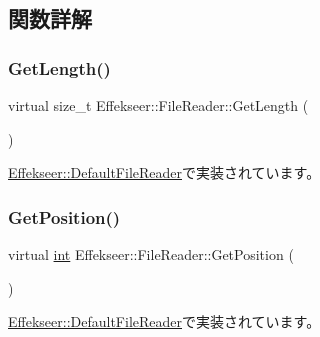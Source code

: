 \subsection{関数詳解}
\mbox{\label{class_effekseer_1_1_file_reader_ae802d02a06437baa0ed74f1927617924}} 
\subsubsection{\texorpdfstring{Get\+Length()}{GetLength()}}
{\footnotesize\ttfamily virtual size\+\_\+t Effekseer\+::\+File\+Reader\+::\+Get\+Length (\begin{DoxyParamCaption}{ }\end{DoxyParamCaption})\hspace{0.3cm}{\ttfamily [pure virtual]}}



\mbox{\hyperlink{class_effekseer_1_1_default_file_reader_a2663a6f3b6bf3aaabadcfe371a85b15d}{Effekseer\+::\+Default\+File\+Reader}}で実装されています。

\mbox{\label{class_effekseer_1_1_file_reader_ad69aa533374ee6661938c7a81495b6d7}} 
\subsubsection{\texorpdfstring{Get\+Position()}{GetPosition()}}
{\footnotesize\ttfamily virtual \mbox{\hyperlink{namespace_effekseer_ace0abf7c2e6947e519ebe8b54cbcc30a}{int}} Effekseer\+::\+File\+Reader\+::\+Get\+Position (\begin{DoxyParamCaption}{ }\end{DoxyParamCaption})\hspace{0.3cm}{\ttfamily [pure virtual]}}



\mbox{\hyperlink{class_effekseer_1_1_default_file_reader_a86001f21782b7cb40a5e0ca4ee155aca}{Effekseer\+::\+Default\+File\+Reader}}で実装されています。

\mbox{\label{class_effekseer_1_1_file_reader_a6274b775770e8ac9ba4f212c80e94be1}} 
